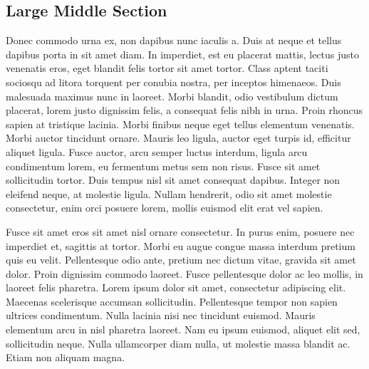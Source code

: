 \documentclass[12pt]{article}
\newenvironment{bibliographyenv}{\begingroup}{\endgroup}
\begin{document}
\subsection*{Large Middle Section}
Donec commodo urna ex, non dapibus nunc iaculis a. Duis\cite{texbook} at neque et tellus dapibus porta in sit amet diam. In imperdiet, est eu placerat mattis, lectus justo venenatis eros, eget blandit felis tortor sit amet tortor. Class aptent taciti sociosqu ad litora torquent per conubia nostra, per inceptos himenaeos. Duis malesuada maximus nunc in laoreet. Morbi blandit, odio vestibulum dictum placerat, lorem justo dignissim felis, a consequat felis nibh in urna. Proin rhoncus sapien at tristique lacinia. Morbi finibus neque eget tellus elementum venenatis. Morbi auctor tincidunt ornare. Mauris leo ligula, auctor eget turpis id, efficitur aliquet ligula. Fusce auctor, arcu semper luctus interdum, ligula arcu condimentum lorem, eu fermentum metus sem non risus. Fusce sit amet sollicitudin tortor. Duis tempus nisl sit amet consequat dapibus. Integer non eleifend neque, at molestie ligula. Nullam hendrerit, odio sit amet molestie consectetur, enim orci posuere lorem, mollis euismod elit erat vel sapien.

Fusce sit amet eros sit amet nisl ornare consectetur. In purus enim, posuere nec imperdiet et, sagittis at tortor. Morbi eu augue congue massa interdum pretium quis eu velit. Pellentesque odio ante, pretium nec dictum vitae, gravida sit amet dolor. Proin dignissim commodo laoreet. Fusce pellentesque dolor ac leo mollis, in laoreet felis pharetra. Lorem ipsum dolor sit amet, consectetur adipiscing elit. Maecenas scelerisque accumsan sollicitudin. Pellentesque tempor non sapien ultrices condimentum. Nulla lacinia nisi nec tincidunt euismod. Mauris elementum arcu in nisl pharetra laoreet. Nam eu ipsum euismod, aliquet elit sed, sollicitudin neque. Nulla ullamcorper diam nulla, ut molestie massa blandit ac. Etiam non aliquam magna. 

\begin{bibliographyenv}
    
    
\end{bibliographyenv}
\end{document}
